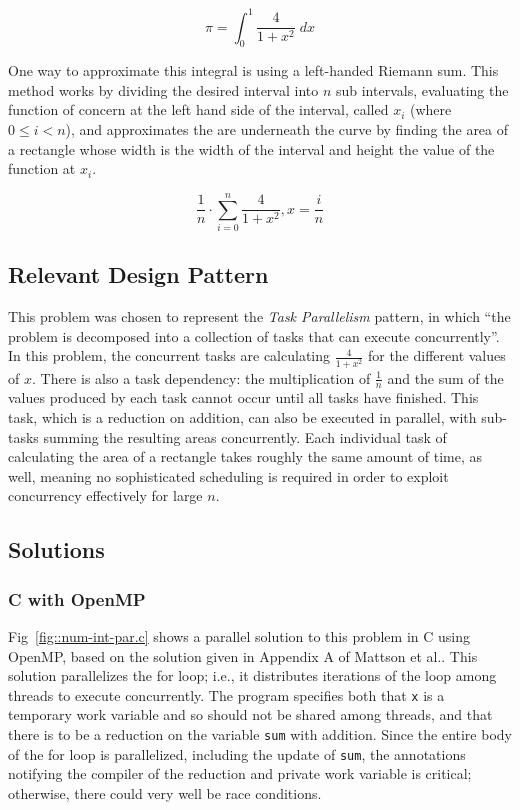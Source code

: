 \begin{equation} \label{eq::pi_int}
\pi = \int_0^1 \frac{4}{1 + x^2} \; dx
\end{equation}

\noindent One way to approximate this integral is using a left-handed Riemann sum. 
This method works by dividing the desired interval into $n$ sub intervals, 
evaluating the function of concern at the left hand side of the interval, called $x_i$ (where $0 \le i < n$), 
and approximates the are underneath the curve by finding the area of a rectangle 
whose width is the width of the interval and height the value of the function at $x_i$.

\[\frac{1}{n} \cdot \sum_{i=0}^n \frac{4}{1 + x^2}, x = \frac{i}{n} \]

\subsection{Relevant Design Pattern}
This problem was chosen to represent the \textit{Task Parallelism} pattern, 
in which ``the problem is decomposed into a collection of tasks that can execute concurrently''\cite{mass}.
In this problem, the concurrent tasks are calculating $\frac{4}{1 + x^2}$ for the different values of $x$. 
There is also a task dependency: the multiplication of $\frac{1}{n}$ and the sum of the values produced by each task 
cannot occur until all tasks have finished. 
This task, which is a reduction on addition, can also be executed in parallel, 
with sub-tasks summing the resulting areas concurrently.
Each individual task of calculating the area of a rectangle takes roughly the same amount of time, as well, 
meaning no sophisticated scheduling is required in order to exploit concurrency effectively for large $n$.

\subsection{Solutions}
\subsubsection{C with OpenMP}
Fig~\ref{fig::num-int-par.c} shows a parallel solution to this problem in C using OpenMP, 
based on the solution given in Appendix A of Mattson et al.\cite{mass}.
This solution parallelizes the for loop; 
i.e., it distributes iterations of the loop among threads to execute concurrently.
The program specifies both that \texttt{x} is a temporary work variable and so should not be shared among threads, 
and that there is to be a reduction on the variable \texttt{sum} with addition. 
Since the entire body of the for loop is parallelized, including the update of \texttt{sum}, 
the annotations notifying the compiler of the reduction and private work variable is critical; 
otherwise, there could very well be race conditions.

